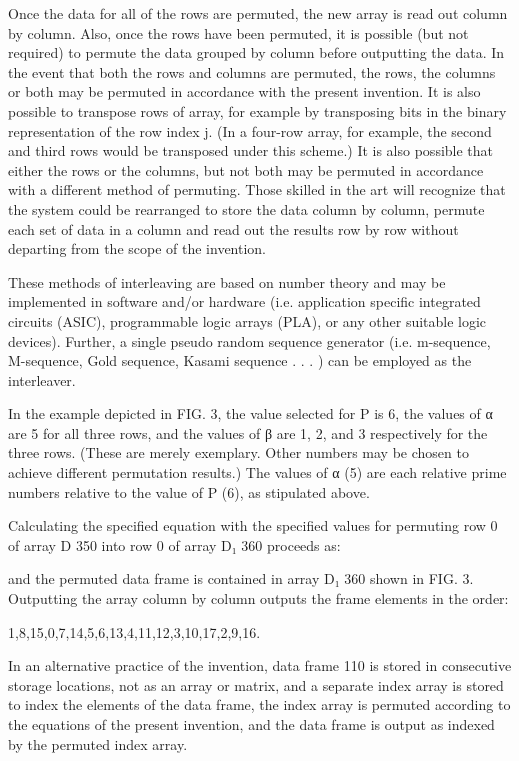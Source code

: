 \documentclass[11pt,a4paper]{article}
\begin{document}
Once the data for all of the rows are permuted, the new array is read out column by column. Also, once the rows have been permuted, it is possible (but not required) to permute the data grouped by column before outputting the data. In the event that both the rows and columns are permuted, the rows, the columns or both may be permuted in accordance with the present invention. It is also possible to transpose rows of array, for example by transposing bits in the binary representation of the row index j. (In a four-row array, for example, the second and third rows would be transposed under this scheme.) It is also possible that either the rows or the columns, but not both may be permuted in accordance with a different method of permuting. Those skilled in the art will recognize that the system could be rearranged to store the data column by column, permute each set of data in a column and read out the results row by row without departing from the scope of the invention.

These methods of interleaving are based on number theory and may be implemented in software and/or hardware (i.e. application specific integrated circuits (ASIC), programmable logic arrays (PLA), or any other suitable logic devices). Further, a single pseudo random sequence generator (i.e. m-sequence, M-sequence, Gold sequence, Kasami sequence . . . ) can be employed as the interleaver.

In the example depicted in FIG. 3, the value selected for P is 6, the values of α are 5 for all three rows, and the values of β are 1, 2, and 3 respectively for the three rows. (These are merely exemplary. Other numbers may be chosen to achieve different permutation results.) The values of α (5) are each relative prime numbers relative to the value of P (6), as stipulated above.

Calculating the specified equation with the specified values for permuting row 0 of array D 350 into row 0 of array D₁ 360 proceeds as:

and the permuted data frame is contained in array D₁ 360 shown in FIG. 3. Outputting the array column by column outputs the frame elements in the order:

1,8,15,0,7,14,5,6,13,4,11,12,3,10,17,2,9,16.

In an alternative practice of the invention, data frame 110 is stored in consecutive storage locations, not as an array or matrix, and a separate index array is stored to index the elements of the data frame, the index array is permuted according to the equations of the present invention, and the data frame is output as indexed by the permuted index array.
\end{document}
